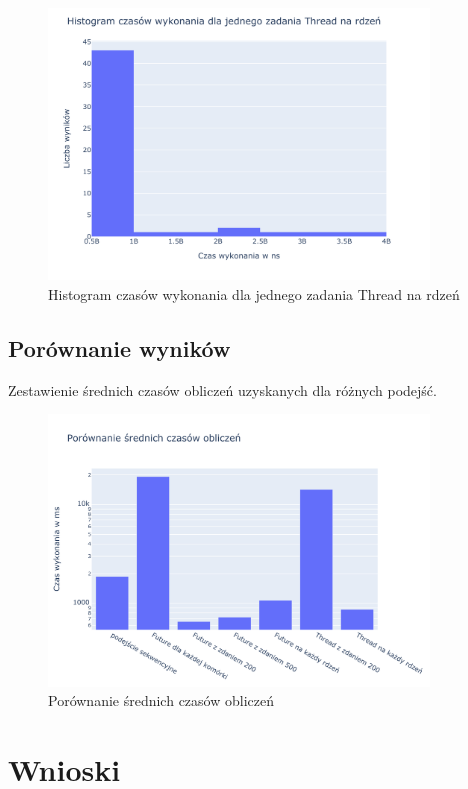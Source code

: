 \documentclass{mwart}
\begin{document}
\begin{figure}[H]
  \centering
  \includegraphics[width=0.9\textwidth]{Parallel_Thread_One_For_Each_Thread_of_life_performance}
  \caption{Histogram czasów wykonania dla jednego zadania Thread na rdzeń}
\end{figure}

\subsection{Porównanie wyników}
Zestawienie średnich czasów obliczeń uzyskanych dla różnych podejść.

\begin{figure}[H]
  \centering
  \includegraphics[width=0.9\textwidth]{Result_comparasion}
  \caption{Porównanie średnich czasów obliczeń}
\end{figure}


\section{Wnioski}
\end{document}

